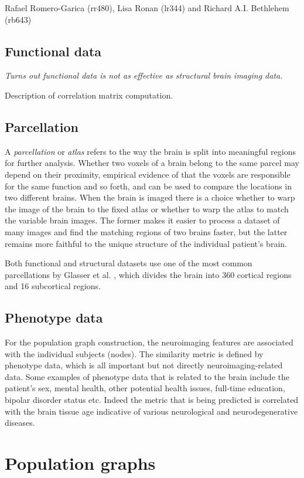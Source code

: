 Rafael Romero-Garica (rr480), Lisa Ronan (lr344) and Richard A.I. Bethlehem (rb643)

\subsection{Functional data}
\textit{Turns out functional data is not as effective as structural brain imaging data.}

Description of correlation matrix computation.

\subsection{Parcellation}
A \textit{parcellation} or \textit{atlas} refers to the way the brain is split into meaningful regions for further analysis. Whether two voxels of a brain belong to the same parcel may depend on their proximity, empirical evidence of that the voxels are responsible for the same function and so forth, and can be used to compare the locations in two different brains. When the brain is imaged there is a choice whether to warp the image of the brain to the fixed atlas or whether to warp the atlas to match the variable brain images. The former makes it easier to process a dataset of many images and find the matching regions of two brains faster, but the latter remains more faithful to the unique structure of the individual patient's brain. 

Both functional and structural datasets use one of the most common parcellations by Glasser et al. \cite{glasser2016multi}, which divides the brain into 360 cortical regions and 16 subcortical regions. 

\subsection{Phenotype data}
For the population graph construction, the neuroimaging features are associated with the individual subjects (nodes). The similarity metric is defined by phenotype data, which is all important but not directly neuroimaging-related data. Some examples of phenotype data that is related to the brain include the patient's sex, mental health, other potential health issues, full-time education, bipolar disorder status etc. Indeed the metric that is being predicted is correlated with the brain tissue age indicative of various neurological and neurodegenerative diseases.

\section{Population graphs}


